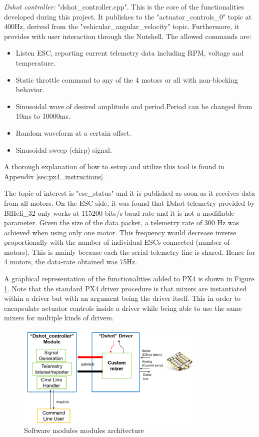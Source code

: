 \textit{Dshot controller: } "dshot\_controller.cpp". This is the core of the functionalities developed during this project.  It publishes to the "actuator\_controls\_0" topic at 400Hz, derived from the "vehicular\_angular\_velocity" topic. Furthermore, it provides with user interaction through the Nutshell. The allowed commands are:
\begin{itemize}
	\item Listen ESC, reporting current telemetry data including RPM, voltage and temperature.
	\item Static throttle command to any of the 4 motors or all with non-blocking behavior.
	\item Sinusoidal wave of desired amplitude and period.Period can be changed from 10ms to 10000ms.
	\item Random waveform at a certain offset.
	\item Sinusoidal sweep (chirp) signal.
\end{itemize}
A thorough explanation of how to setup and utilize this tool is found in Appendix \ref{sec:px4_instructions}.
\newline

The topic of interest is "esc\_status" and it is published as soon as it receives data from all motors. On the ESC side, it was found that Dshot telemetry provided by BlHeli\_32 only works at 115200 bits/s baud-rate and it is not a  modifiable parameter. Given the size of the data packet, a telemetry rate of 300 Hz was achieved when using only one motor. This frequency would decrease inverse proportionally with the number of individual ESCs connected (number of motors). This is mainly because each the serial telemetry line is shared. Hence for 4 motors, the data-rate obtained was 75Hz. 
\newline

A graphical representation of the functionalities added to PX4 is shown in Figure \ref{fig:sorftware_arch}. Note that the standard PX4 driver procedure is that mixers are instantiated within a driver but with an argument being the driver itself. This in order to encapsulate actuator controls inside a driver while being able to use the same mixers for multiple kinds of drivers.

\begin{figure} 
    \centering
    \includegraphics[width=0.8\textwidth]{images/software_architecture.PNG}
    \caption{Software modules modules architecture}
    \label{fig:sorftware_arch}
\end{figure}

